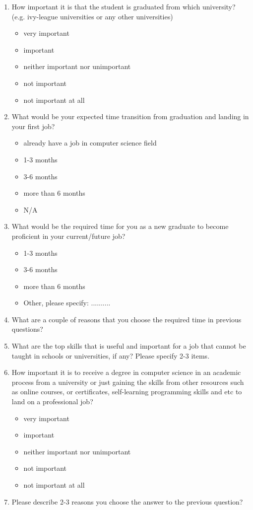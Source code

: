 \documentclass[12pt,a4paper,titlepage]{article}
\begin{document}
\begin{enumerate}
	\item How important it is that the student is graduated from which university? (e.g. ivy-league universities or any other universities)
	\begin{itemize}
		\item very important
		\item important
		\item neither important nor unimportant
		\item not important
		\item not important at all
	\end{itemize}
	
	\item What would be your expected time transition from graduation and landing in your first job?
	\begin{itemize}
		\item already have a job in computer science field
		\item 1-3 months
		\item 3-6 months
		\item more than 6 months
		\item N/A
	\end{itemize}

	\item What would be the required time for you as a new graduate to become proficient in your current/future job?
	\begin{itemize}
		\item 1-3 months
		\item 3-6 months
		\item more than 6 months
		\item Other, please specify: ..........
	\end{itemize}


	\item What are a couple of reasons that you choose the required time in previous questions?

	\item What are the top skills that is useful and important for a job that cannot be taught in schools or universities, if any? Please specify 2-3 items.

	\item How important it is to receive a degree in computer science in an academic process from a university or just gaining the skills from other resources such as online courses, or certificates, self-learning programming skills and etc to land on a professional job?
	\begin{itemize}
		\item very important
		\item important
		\item neither important nor unimportant
		\item not important
		\item not important at all
	\end{itemize}

	\item Please describe 2-3 reasons  you choose the answer to the previous question?

\end{enumerate}
\end{document}
